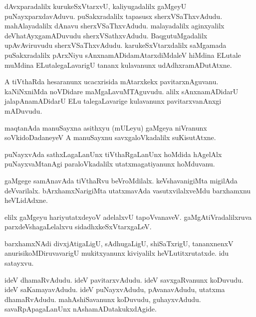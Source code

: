 \documentclass{article}
\begin{document}
\begin{mn}
dAvxparadalilx kurukeSxVtarxvU, kaliyugadalilx gaMgeyU puNayxparxdavAduvu. puSakxradalilx 
tapasusx sherxVSaThxvAdudu. mahAlayadalilx dAnavu sherxVSaThxvAdudu. malayadalilx aginxyalilx 
deVhatAyxgamADuvudu sherxVSathxvAdudu. BaqgutuMgadalilx upAvAviruvudu sherxVSaThxvAdudu. 
karukeSxVtarxdalilx saMgamada puSakxradalilx pArxNiyu sAnxnamADidamAtarxdiMdaleV hiMdina ELutale 
muMdina ELutalegaLavarigU tananx kulavanunx udAdhxramADutAtxne.
\end{mn}

\begin{mn}
A tiVthaRda hesaranunx ucacxrisida mAtarxkekx pavitarxnAguvanu. kaNiNxniMda noVDidare 
maMgaLavuMTAguvudu. alilx sAnxnamADidarU jalapAnamADidarU ELu talegaLavarige kulavanunx 
pavitarxvanAnxgi mADuvudu.
\end{mn}

\begin{mn}
maqtanAda manuSayxna asithxyu (mULeyu) gaMgeya niVranunx soVkidoDadaneyeV A manuSayxnu 
savxgaloVkadalilx suKisutAtxne.
\end{mn}

\begin{mn}
puNayxvAda sathxLagaLanUnx tiVthaRgaLanUnx hoMdida hAgelAlx puNayxvaMtanAgi paraloVkadalilx 
utatxmagatiyanunx hoMduvanu.
\end{mn}

\begin{mn}
gaMgege samAnavAda tiVthaRvu beVroMdilalx. keVshavanigiMta migilAda deVvarilalx. bArxhamxNarigiMta 
utatxmavAda vasutxvilalxveMdu barxhamxnu heVLidAdxne.
\end{mn}

\begin{mn}
elilx gaMgeyu hariyutatxdeyoV adelalxvU tapoVvanaveV. gaMgAtiVradalilxruva parxdeVshagaLelalxvu 
sidadhxkeSxVtarxgaLeV.
\end{mn}

\begin{mn}
barxhamxNAdi divxjAtigaLigU, sAdhugaLigU, shiSaTxrigU, tananxnenxV anurisikoMDiruvavarigU 
mukitxyanunx kiviyalilx heVLutitxrutatxde. idu satayxvu.
\end{mn}

\begin{mn}
ideV dhamaRvAdudu. ideV pavitarxvAdudu. ideV savxgaRvanunx koDuvudu.  ideV saKamayavAdudu. ideV 
puNayxvAdudu, pAvanavAdudu, utatxma dhamaRvAdudu. mahAshiSavanunx koDuvudu, guhayxvAdudu. 
savaRpApagaLanUnx nAshamADatakukxdAgide.
\end{mn}
\end{document}

